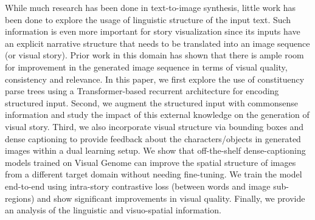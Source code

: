 While much research has been done in text-to-image synthesis, little work has been done to explore the usage of linguistic structure of the input text. Such information is even more important for story visualization since its inputs have an explicit narrative structure that needs to be translated into an image sequence (or visual story). Prior work in this domain has shown that there is ample room for improvement in the generated image sequence in terms of visual quality, consistency and relevance. In this paper, we first explore the use of constituency parse trees using a Transformer-based recurrent architecture for encoding structured input. Second, we augment the structured input with commonsense information and study the impact of this external knowledge on the generation of visual story. Third, we also incorporate visual structure via bounding boxes and dense captioning to provide feedback about the characters/objects in generated images within a dual learning setup. We show that off-the-shelf dense-captioning models trained on Visual Genome can improve the spatial structure of images from a different target domain without needing fine-tuning. We train the model end-to-end using intra-story contrastive loss (between words and image sub-regions) and show significant improvements in visual quality. Finally, we provide an analysis of the linguistic and visuo-spatial information.
